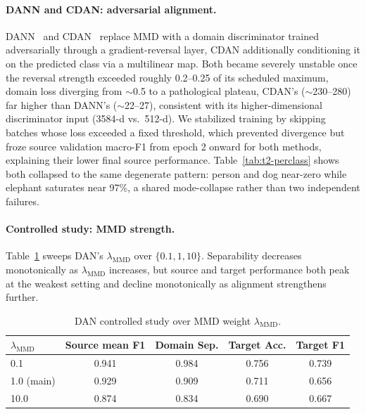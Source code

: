 \documentclass{article}
\begin{document}
\paragraph{DANN and CDAN: adversarial alignment.}
DANN~\citep{ganin2016dann} and CDAN~\citep{long2018cdan} replace MMD with a domain discriminator trained adversarially through a gradient-reversal layer, CDAN additionally conditioning it on the predicted class via a multilinear map. Both became severely unstable once the reversal strength exceeded roughly 0.2--0.25 of its scheduled maximum, domain loss diverging from $\sim$0.5 to a pathological plateau, CDAN's ($\sim$230--280) far higher than DANN's ($\sim$22--27), consistent with its higher-dimensional discriminator input (3584-d vs.\ 512-d). We stabilized training by skipping batches whose loss exceeded a fixed threshold, which prevented divergence but froze source validation macro-F1 from epoch 2 onward for both methods, explaining their lower final source performance. Table~\ref{tab:t2-perclass} shows both collapsed to the same degenerate pattern: person and dog near-zero while elephant saturates near 97\%, a shared mode-collapse rather than two independent failures.

\paragraph{Controlled study: MMD strength.}
Table~\ref{tab:t2-controlled} sweeps DAN's $\lambda_\text{MMD}$ over $\{0.1, 1, 10\}$. Separability decreases monotonically as $\lambda_\text{MMD}$ increases, but source and target performance both peak at the weakest setting and decline monotonically as alignment strengthens further.

\begin{table}[t]
  \caption{DAN controlled study over MMD weight $\lambda_\text{MMD}$.}
  \label{tab:t2-controlled}
  \centering
  \footnotesize
  \begin{tabular}{lcccc}
    \toprule
    $\lambda_\text{MMD}$ & Source mean F1 & Domain Sep. & Target Acc. & Target F1 \\
    \midrule
    0.1            & 0.941 & 0.984 & 0.756 & 0.739 \\
    1.0 (main)     & 0.929 & 0.909 & 0.711 & 0.656 \\
    10.0           & 0.874 & 0.834 & 0.690 & 0.667 \\
    \bottomrule
  \end{tabular}
\end{table}
\end{document}
